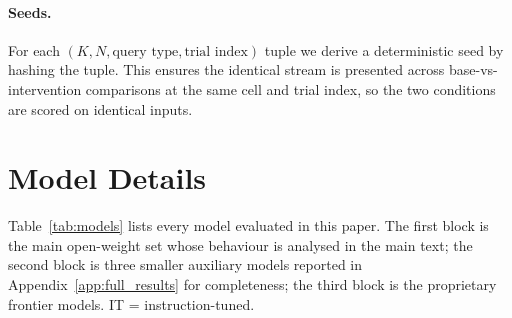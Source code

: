 \documentclass[11pt]{article}
\begin{document}
\paragraph{Seeds.}
For each $(K, N, \text{query type}, \text{trial index})$ tuple we
derive a deterministic seed by hashing the tuple. This ensures the
identical stream is presented across base-vs-intervention
comparisons at the same cell and trial index, so the two conditions
are scored on identical inputs.

\section{Model Details}
\label{app:models}

Table~\ref{tab:models} lists every model evaluated in this paper.
The first block is the main open-weight set whose behaviour is
analysed in the main text; the second block is three smaller
auxiliary models reported in Appendix~\ref{app:full_results} for
completeness; the third block is the proprietary frontier models.
IT = instruction-tuned.
\end{document}
